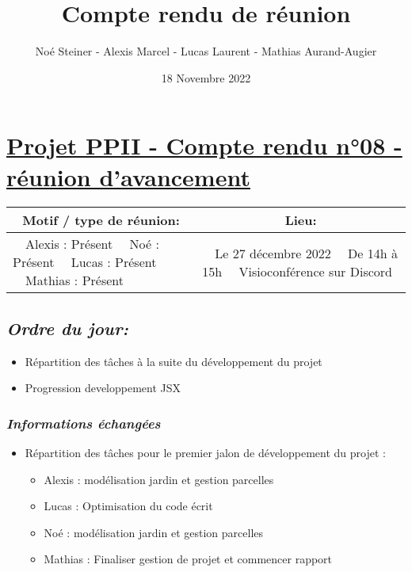 \documentclass[french,a4paper]{article}
\author{Noé Steiner - Alexis Marcel - Lucas Laurent - Mathias Aurand-Augier}
\date{18 Novembre 2022}
\newcommand{\tabitem}{\textbullet~~}\title{Compte rendu de réunion}
\begin{document}
\maketitle

\section*{\underline{Projet PPII - Compte rendu n°08 - réunion d'avancement}}

\begin{table}[!htb]
  \centering
  \begin{tabular}{| p{7cm} | p{7cm} |}
    \hline
    \multicolumn{1}{|c|}{ Motif / type de réunion:} & \multicolumn{1}{c|}{Lieu:} \\
    \hline
    \tabitem Alexis : Présent\newline
    \tabitem Noé : Présent\newline
    \tabitem Lucas : Présent\newline
    \tabitem Mathias : Présent                      &
    \tabitem Le 27 décembre 2022\newline
    \tabitem De 14h à 15h\newline
    \tabitem Visioconférence sur Discord                                         \\
    \hline
  \end{tabular}
\end{table}

\subsection*{\textit{Ordre du jour:}}

\begin{itemize}
  \item Répartition des tâches à la suite du développement du projet
  \item Progression developpement JSX
\end{itemize}

\subsubsection*{\textit{Informations échangées}}
\begin{itemize}
  \item Répartition des tâches pour le premier jalon de développement du projet :
    \begin{itemize}
      \item Alexis : modélisation jardin et gestion parcelles
      \item Lucas : Optimisation du code écrit
      \item Noé : modélisation jardin et gestion parcelles
      \item Mathias : Finaliser gestion de projet et commencer rapport
    \end{itemize}
\end{itemize}
\end{document}
